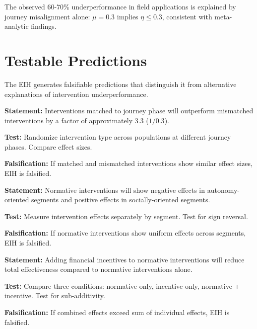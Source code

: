\begin{corollary}
\label{cor:underperformance}
The observed 60-70\% underperformance in field applications is explained by
journey misalignment alone: $\mu = 0.3$ implies $\eta \leq 0.3$, consistent with
meta-analytic findings.
\end{corollary}


\section{Testable Predictions}
\label{sec:eih-predictions}

The EIH generates falsifiable predictions that distinguish it from alternative
explanations of intervention underperformance.

\begin{tcolorbox}[colback=green!5!white, colframe=green!75!black,
    title=Prediction EIH-P1: Journey Alignment Effect]
\textbf{Statement:} Interventions matched to journey phase will outperform
mismatched interventions by a factor of approximately 3.3 ($1/0.3$).

\textbf{Test:} Randomize intervention type across populations at different
journey phases. Compare effect sizes.

\textbf{Falsification:} If matched and mismatched interventions show similar
effect sizes, EIH is falsified.
\end{tcolorbox}

\begin{tcolorbox}[colback=green!5!white, colframe=green!75!black,
    title=Prediction EIH-P2: Segment Heterogeneity]
\textbf{Statement:} Normative interventions will show negative effects in
autonomy-oriented segments and positive effects in socially-oriented segments.

\textbf{Test:} Measure intervention effects separately by segment. Test for
sign reversal.

\textbf{Falsification:} If normative interventions show uniform effects across
segments, EIH is falsified.
\end{tcolorbox}

\begin{tcolorbox}[colback=green!5!white, colframe=green!75!black,
    title=Prediction EIH-P3: Crowding Out]
\textbf{Statement:} Adding financial incentives to normative interventions will
reduce total effectiveness compared to normative interventions alone.

\textbf{Test:} Compare three conditions: normative only, incentive only,
normative + incentive. Test for sub-additivity.

\textbf{Falsification:} If combined effects exceed sum of individual effects,
EIH is falsified.
\end{tcolorbox}

